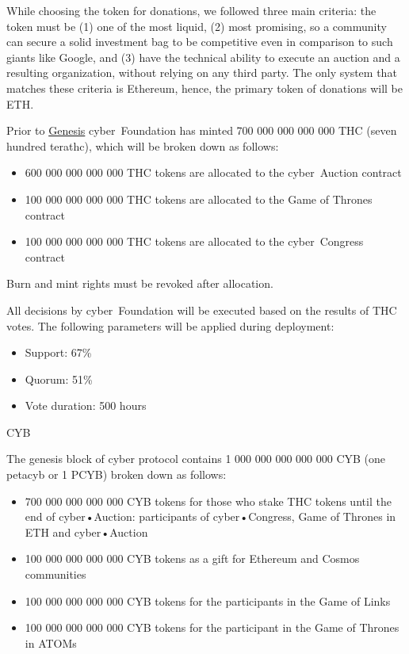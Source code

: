 \documentclass[8pt,oneside]{amsart}
\makeatletter
\renewcommand\subsection{\@startsection{subsection}
                                    {2}{\z@}
                                    {-3.25ex\@plus -1ex \@minus -.2ex}
                                    {0ex \@plus .2ex}
                                    {\play\Large}
                        }
\newcommand{\titleSection}[1]{\subsection{#1}}
\newcommand{\code}[1]{{\PlayBold #1}}
\newenvironment{Figure}
  {\par\medskip\noindent\minipage{\linewidth}}
  {\endminipage\par\medskip}
\makeatother
\begin{document}
While choosing the token for donations, we followed three main criteria: the token must be (1) one of the most liquid, (2)
most promising, so a community can secure a solid investment bag to be competitive even in comparison to such giants like
Google, and (3) have the technical ability to execute an auction and a resulting organization, without relying on any third party. The only system that matches these criteria is Ethereum, hence, the primary token of donations will be ETH.

Prior to \hyperlink{genesis}{Genesis} cyber~Foundation has minted 700 000 000 000 000 THC (seven hundred terathc), which will be broken down as follows:

\begin{itemize}
\item 600 000 000 000 000 THC tokens are allocated to the cyber~Auction contract
\item 100 000 000 000 000 THC tokens are allocated to the Game of Thrones contract
\item 100 000 000 000 000 THC tokens are allocated to the cyber~Congress contract
\end{itemize}

\begin{Figure}
 \centering
 
\end{Figure}

Burn and mint rights must be revoked after allocation.

All decisions by cyber~Foundation will be executed based on the results of THC votes. The following parameters will be
applied during deployment:

\begin{itemize}
\item Support: 67\%
\item Quorum: 51\%
\item Vote duration: 500 hours
\end{itemize}

\titleSection{CYB}\label{CYB}

The genesis block of \code{cyber} protocol contains 1 000 000 000 000 000 CYB (one petacyb or 1 PCYB) broken down as follows:

\begin{itemize}
\item 700 000 000 000 000 CYB tokens for those who stake THC tokens until the end of cyber•Auction: participants of cyber•Congress, Game of Thrones in ETH and cyber•Auction
\item 100 000 000 000 000 CYB tokens as a gift for Ethereum and Cosmos communities
\item 100 000 000 000 000 CYB tokens for the participants in the Game of Links
\item 100 000 000 000 000 CYB tokens for the participant in the Game of Thrones in ATOMs
\end{itemize}
\end{document}
